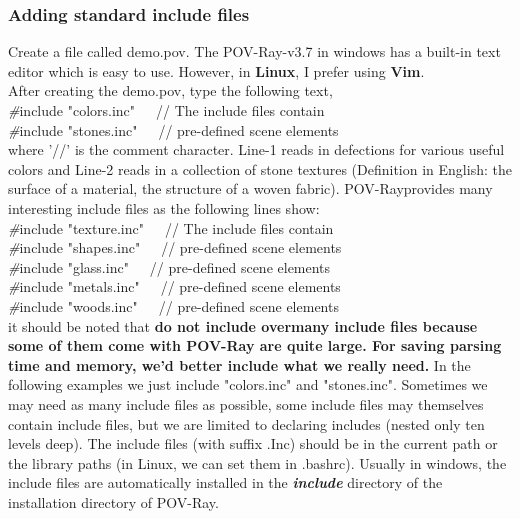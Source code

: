 \documentclass[fleqn,10pt]{wlscirep}
\newcommand*{\PV}{POV-Ray}
\newcommand*{\DF}{Definition in English}
\begin{document}
\subsubsection{Adding standard include files}
Create a file called demo.pov. The \PV-v3.7 in windows has a built-in text editor which is easy to use. However, in \textbf{Linux}, I prefer using \textbf{Vim}.\\
\newline
After creating the demo.pov, type the following text,\\
\textcolor[rgb]{0.2,0.1,1}{\emph{\#}include "colors.inc"}\ \ \     // The include files contain \\
\textcolor[rgb]{0.2,0.1,1}{\emph{\#}include "stones.inc"}\ \ \     // pre-defined scene elements\\
where '//' is the comment character. Line-1 reads in defections for various useful colors and Line-2 reads in a collection of stone textures (\DF: the surface of a material, the structure of a woven fabric). \PV provides many interesting include files as the following lines show:\\
\textcolor[rgb]{0.2,0.1,1}{\emph{\#}include "texture.inc"}\ \ \     // The include files contain\\
\textcolor[rgb]{0.2,0.1,1}{\emph{\#}include "shapes.inc"}\ \ \     // pre-defined scene elements\\
\textcolor[rgb]{0.2,0.1,1}{\emph{\#}include "glass.inc"}\ \ \     // pre-defined scene elements\\
\textcolor[rgb]{0.2,0.1,1}{\emph{\#}include "metals.inc"}\ \ \     // pre-defined scene elements\\
\textcolor[rgb]{0.2,0.1,1}{\emph{\#}include "woods.inc"}\ \ \     // pre-defined scene elements\\
it should be noted that \textbf{do not include overmany include files because some of them come with \PV{} are quite large. For saving parsing time and memory, we'd better include what we really need.} In the following examples we just include "colors.inc" and "stones.inc". Sometimes we may need as many include files as possible, some include files may themselves contain include files, but we are limited to declaring includes (nested only ten levels deep). The include files (with suffix .Inc) should be in the current path or the library paths (in Linux, we can set them in .bashrc). Usually in windows, the include files are automatically installed in the \emph{\textbf{include}} directory of the installation directory of \PV.
\end{document}
